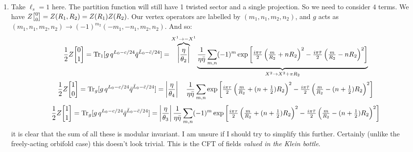 \documentclass[11pt]{article}
\begin{document}
\begin{enumerate}
	\item Take $\ell_s = 1$ here. The partition function will still have 1 twisted sector and a single projection. So we need to consider $4$ terms. We have $Z\twist00 = Z(R_1, R_2) = Z(R_1) Z(R_2)$. Our vertex operators are labelled by $(m_1, n_1, m_2, n_2)$, and $g$ acts as $(m_1, n_1, m_2, n_2) \to (-1)^{m_2} (-m_1, -n_1, m_2, n_2)$. And so:
	\[
		\frac12 Z\twist01 = \mathrm{Tr}_1[g\, q^{L_0 - c/24} \bar q^{\bar L_0 - \bar c/24}] = \overbrace{\left|\frac{\eta}{\theta_2}\right|}^{X^1 \to -X^1}
		 \underbrace{\frac{1}{\eta \bar \eta}\sum_{m, n} (-1)^m \exp\left[\tfrac{i \pi \tau}{2} \left( \tfrac{m}{R_2} + n R_2 \right)^2 - \tfrac{i \pi \bar \tau}{2} \left( \tfrac{m}{R_2} - n R_2 \right)^2  \right] }_{X^2 \to X^2 + \pi R_2}
	\]
	\[
		\frac12 Z\twist10 = \mathrm{Tr}_g[g\, q^{L_0 - c/24} \bar q^{\bar L_0 - \bar c/24}] = \left|\frac{\eta}{\theta_4}\right| \quad \frac{1}{\eta \bar \eta}\sum_{m, n} \exp\left[\tfrac{i \pi \tau}{2} \left( \tfrac{m}{R_2} + (n + \tfrac12) R_2 \right)^2 - \tfrac{i \pi \bar \tau}{2} \left( \tfrac{m}{R_2} - (n + \tfrac12) R_2 \right)^2  \right]
	\]
	\[
		\frac12 Z\twist11 = \mathrm{Tr}_g[g\, q^{L_0 - c/24} \bar q^{\bar L_0 - \bar c/24}] = \left|\frac{\eta}{\theta_3}\right| \frac{1}{\eta \bar \eta}\sum_{m, n} (-1)^m \exp\left[\tfrac{i \pi \tau}{2} \left( \tfrac{m}{R_2} + (n + \tfrac12) R_2 \right)^2 - \tfrac{i \pi \bar \tau}{2} \left( \tfrac{m}{R_2} - (n + \tfrac12) R_2 \right)^2  \right]
	\]
	it is clear that the sum of all these is modular invariant. I am unsure if I should try to simplify this further. Certainly (unlike the freely-acting orbifold case) this doesn't look trivial. This is the CFT of fields \emph{valued in the Klein bottle}.
	

\end{enumerate}
\end{document}
